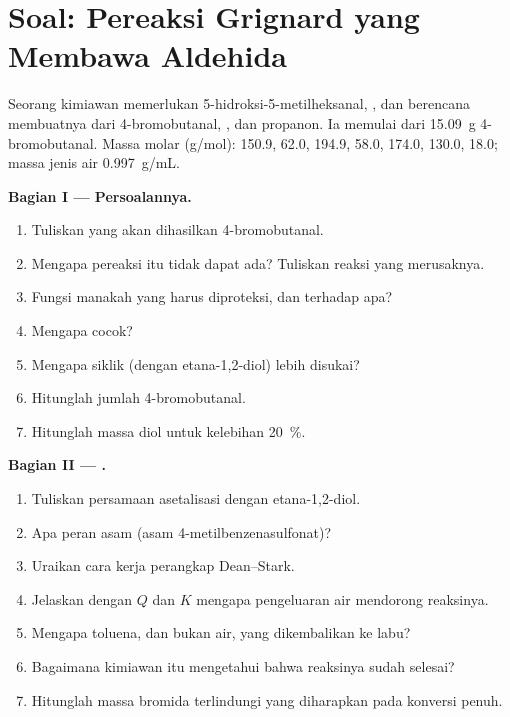 \section{Soal: Pereaksi Grignard yang Membawa Aldehida}

\begin{problem}
\label{pb:b1:acetals-protection:1}
Seorang kimiawan memerlukan 5-hidroksi-5-metilheksanal,
, dan berencana membuatnya dari
4-bromobutanal, , dan propanon. Ia memulai dari
\qty{15.09}{g} 4-bromobutanal. Massa molar (\unit{g/mol}): 
150.9,  62.0,  194.9,  58.0,
 174.0,  130.0,  18.0; massa jenis air
\qty{0.997}{g/mL}.

\medskip
\noindent\textbf{Bagian I --- Persoalannya.}
\begin{enumerate}
  \item Tuliskan  yang akan dihasilkan 4-bromobutanal.
  \item Mengapa pereaksi itu tidak dapat ada? Tuliskan reaksi yang
        merusaknya.
  \item Fungsi manakah yang harus diproteksi, dan terhadap apa?
  \item Mengapa  cocok?
  \item Mengapa  siklik (dengan etana-1,2-diol) lebih disukai?
  \item Hitunglah jumlah 4-bromobutanal.
  \item Hitunglah massa diol untuk kelebihan \qty{20}{\percent}.
\end{enumerate}

\medskip
\noindent\textbf{Bagian II --- .}
\begin{enumerate}[resume]
  \item Tuliskan persamaan asetalisasi dengan etana-1,2-diol.
  \item Apa peran  asam (asam 4-metilbenzenasulfonat)?
  \item Uraikan cara kerja perangkap Dean--Stark.
  \item Jelaskan dengan $Q$ dan $K$ mengapa pengeluaran air mendorong
        reaksinya.
  \item Mengapa toluena, dan bukan air, yang dikembalikan ke labu?
  \item Bagaimana kimiawan itu mengetahui bahwa reaksinya sudah selesai?
  \item Hitunglah massa bromida terlindungi yang diharapkan pada konversi
        penuh.
\end{enumerate}


\end{problem}
